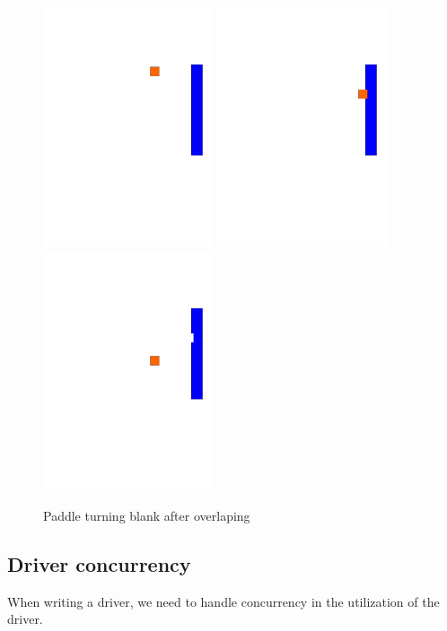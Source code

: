 \begin{figure}[h]
	\label{fig:pong_overlapping}
	\includegraphics[width=5cm, trim= 0 240 0 100]{img/pong_overlapping_0.pdf}
	\includegraphics[width=5cm, trim= 0 240 0 100]{img/pong_overlapping_1.pdf}
	\includegraphics[width=5cm, trim= 0 240 0 100]{img/pong_overlapping_2.pdf}
	
	\caption{Paddle turning blank after overlaping}
\end{figure}

\subsection{Driver concurrency}
When writing a driver, we need to handle concurrency in the utilization of the driver.
